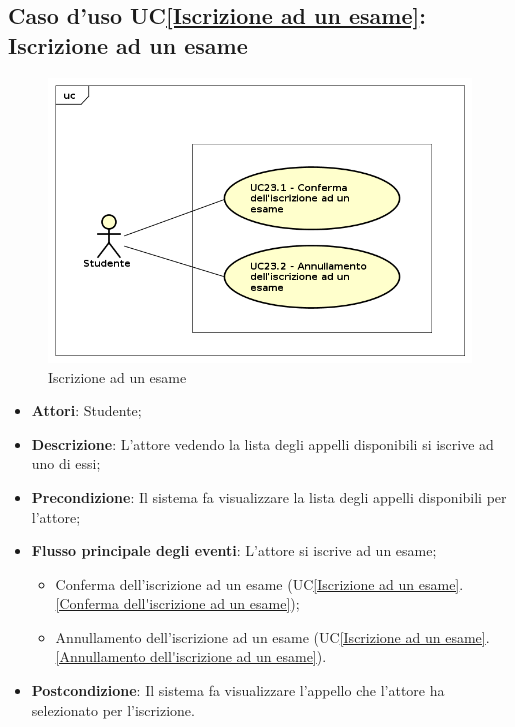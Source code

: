 \subsection{Caso d'uso UC\ref{Iscrizione ad un esame}: Iscrizione ad un esame}
\begin{figure} [H]
	\centering
	\includegraphics[scale=0.45]{./img/UseCaseDiagram023.png}
	\caption{Iscrizione ad un esame}\label{}
\end{figure}
\begin{itemize}
	\item \textbf{Attori}: Studente;
	\item \textbf{Descrizione}: L'attore vedendo la lista degli appelli disponibili si iscrive ad uno di essi;
	\item \textbf{Precondizione}: Il sistema fa visualizzare la lista degli appelli disponibili per l'attore;
	\item \textbf{Flusso principale degli eventi}: L'attore si iscrive ad un esame;
	\begin{itemize}
		\item Conferma dell'iscrizione ad un esame (UC\ref{Iscrizione ad un esame}.\ref{Conferma dell'iscrizione ad un esame});
		\item Annullamento dell'iscrizione ad un esame (UC\ref{Iscrizione ad un esame}.\ref{Annullamento dell'iscrizione ad un esame}).
	\end{itemize}
	\item \textbf{Postcondizione}: Il sistema fa visualizzare l'appello che l'attore ha selezionato per l'iscrizione.
\end{itemize}

